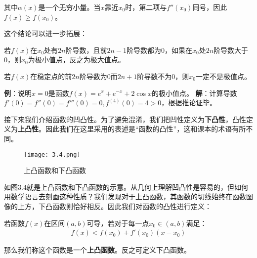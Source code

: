 \documentclass{ctexart}
\let\oldtextbf\textbf %
\renewcommand{\textbf}[1]{\textcolor{btex}{\oldtextbf{#1}}} %
\begin{document}
其中$\alpha(x)$是一个无穷小量。当$x$靠近$x_0$时，第二项与$f''(x_0)$同号，因此$f(x)\geq f(x_0)$。

这个结论可以进一步拓展：
\begin{tcolorbox}[
    colback=bac1,     %
    colframe=fra1,   %
    coltitle=white,             %
    coltext=tex1,
    title=拓展,
    fonttitle=\bfseries,        %
arc=3mm,                     %
breakable
]
若$f(x)$在$x_0$处有$2n$阶导数，且前$2n-1$阶导数都为0，如果在$x_0$处$2n$阶导数大于0，则$x_0$为极小值点，反之为极大值点。

若$f(x)$在稳定点的前$2n$阶导数为0而$2n+1$阶导数不为0，则$x_0$一定不是极值点。
\end{tcolorbox}

\textbf{例}：说明$x=0$是函数$f(x)=e^x+e^{-x}+2\cos x$的极小值点。
\textbf{解}：计算导数$f'(0)=f''(0)=f'''(0)=0,f^{(4)}(0)=4>0$，根据推论证毕。

接下来我们介绍函数的凹凸性。为了避免混淆，我们把凹性定义为\textbf{下凸性}，凸性定义为\textbf{上凸性}。因此我们在这里采用的表述是“函数的凸性”，这和课本的术语有所不同。
\begin{figure} 
\centering     
\renewcommand{\figurename}{图}     
\renewcommand{\thefigure}{3.4}    
\begin{myimagebox}[width=0.5\textwidth] %
\texttt{[image: 3.4.png]} %
\end{myimagebox}     
\caption{\label{fig:3.4}上凸函数和下凸函数}   
\end{figure}

如图3.4就是上凸函数和下凸函数的示意。从几何上理解凹凸性是容易的，但如何用数学语言去刻画这种性质？我们发现对于上凸函数，其函数的切线始终在函数图像的上方，下凸函数则恰好相反。因此我们对函数的凸性进行定义：
\begin{tcolorbox}[
    colback=bac2,     %
    colframe=fra2,   %
    coltitle=white,             %
    coltext=tex2,
    title=函数的凸性,
    fonttitle=\bfseries,        %
arc=3mm,                     %
breakable
]
若函数$f(x)$在区间$(a,b)$可导，若对于每一点$x_0\in (a,b)$满足：
\begin{align*}
    f(x)<f(x_0)+f'(x_0)(x-x_0)\tag{3-12}
\end{align*}

那么我们称这个函数是一个\textbf{上凸函数}。反之可定义下凸函数。
\end{tcolorbox}
\end{document}
